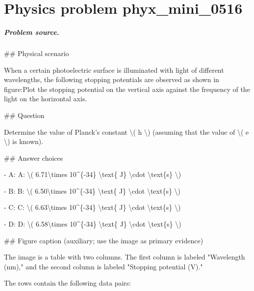 
\chapter{Physics problem phyx\_mini\_0516}
\label{ch:PhyXMiniProblems_problem_phyx_mini_0516}

\paragraph{Problem source.}
\#\# Physical scenario

When a certain photoelectric surface is illuminated with light of different wavelengths, the following stopping potentials are observed as shown in figure:Plot the stopping potential on the vertical axis against the frequency of the light on the horizontal axis.

\#\# Question

Determine the value of Planck's constant \textbackslash{}( h \textbackslash{}) (assuming that the value of \textbackslash{}( e \textbackslash{}) is known).

\#\# Answer choices

- A: A: \textbackslash{}( 6.71\textbackslash{}times 10\textasciicircum{}\{-34\} \textbackslash{}text\{ J\} \textbackslash{}cdot \textbackslash{}text\{s\} \textbackslash{})

- B: B: \textbackslash{}( 6.50\textbackslash{}times 10\textasciicircum{}\{-34\} \textbackslash{}text\{ J\} \textbackslash{}cdot \textbackslash{}text\{s\} \textbackslash{})

- C: C: \textbackslash{}( 6.63\textbackslash{}times 10\textasciicircum{}\{-34\} \textbackslash{}text\{ J\} \textbackslash{}cdot \textbackslash{}text\{s\} \textbackslash{})

- D: D: \textbackslash{}( 6.58\textbackslash{}times 10\textasciicircum{}\{-34\} \textbackslash{}text\{ J\} \textbackslash{}cdot \textbackslash{}text\{s\} \textbackslash{})

\#\# Figure caption (auxiliary; use the image as primary evidence)

The image is a table with two columns. The first column is labeled "Wavelength (nm)," and the second column is labeled "Stopping potential (V)." 

The rows contain the following data pairs:


